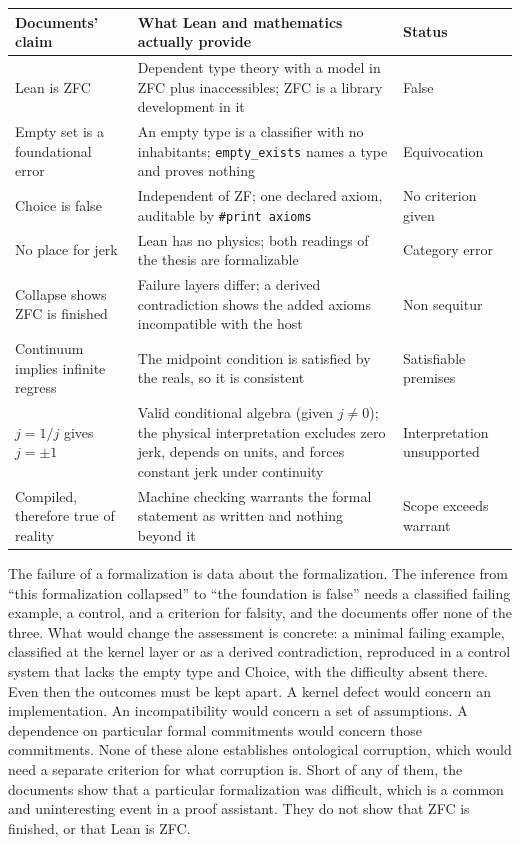 \documentclass[11pt]{article}
\begin{document}
\begin{center}
\small
\begin{tabular}{@{}>{\raggedright\arraybackslash}p{}>{\raggedright\arraybackslash}p{}>{\raggedright\arraybackslash}p{}@{}}
\toprule
Documents' claim & What Lean and mathematics actually provide & Status \\
\midrule
Lean is ZFC & Dependent type theory with a model in ZFC plus inaccessibles; ZFC is a library development in it & False \\
Empty set is a foundational error & An empty type is a classifier with no inhabitants; \texttt{empty\_exists} names a type and proves nothing & Equivocation \\
Choice is false & Independent of ZF; one declared axiom, auditable by \texttt{\#print axioms} & No criterion given \\
No place for jerk & Lean has no physics; both readings of the thesis are formalizable & Category error \\
Collapse shows ZFC is finished & Failure layers differ; a derived contradiction shows the added axioms incompatible with the host & Non sequitur \\
Continuum implies infinite regress & The midpoint condition is satisfied by the reals, so it is consistent & Satisfiable premises \\
$j=1/j$ gives $j=\pm1$ & Valid conditional algebra (given $j\neq0$); the physical interpretation excludes zero jerk, depends on units, and forces constant jerk under continuity & Interpretation unsupported \\
Compiled, therefore true of reality & Machine checking warrants the formal statement as written and nothing beyond it & Scope exceeds warrant \\
\bottomrule
\end{tabular}
\end{center}

The failure of a formalization is data about the formalization. The inference from ``this formalization collapsed'' to ``the foundation is false'' needs a classified failing example, a control, and a criterion for falsity, and the documents offer none of the three. What would change the assessment is concrete: a minimal failing example, classified at the kernel layer or as a derived contradiction, reproduced in a control system that lacks the empty type and Choice, with the difficulty absent there. Even then the outcomes must be kept apart. A kernel defect would concern an implementation. An incompatibility would concern a set of assumptions. A dependence on particular formal commitments would concern those commitments. None of these alone establishes ontological corruption, which would need a separate criterion for what corruption is. Short of any of them, the documents show that a particular formalization was difficult, which is a common and uninteresting event in a proof assistant. They do not show that ZFC is finished, or that Lean is ZFC.
\end{document}
